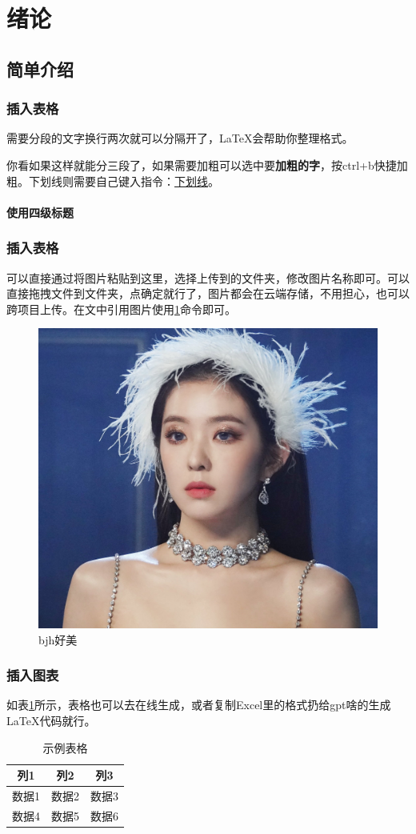 
\section{绪论}
\subsection{简单介绍}
\subsubsection{插入表格}
需要分段的文字换行两次就可以分隔开了，\LaTeX 会帮助你整理格式。

你看如果这样就能分三段了，如果需要加粗可以选中要\textbf{加粗的字}，按ctrl+b快捷加粗。下划线则需要自己键入指令：\underline{下划线}。
\paragraph{使用四级标题}

\subsubsection{插入表格}
可以直接通过将图片粘贴到这里，选择上传到的文件夹，修改图片名称即可。可以直接拖拽文件到文件夹，点确定就行了，图片都会在云端存储，不用担心，也可以跨项目上传。在文中引用图片使用\ref{fig:exm}命令即可。
\begin{figure}[h]
    \centering
    \includegraphics[width=0.3\linewidth]{figs/image.png}
    \caption{bjh好美}
    \label{fig:exm}
\end{figure}

\subsubsection{插入图表}如表\ref{tab:example}所示，表格也可以去在线生成，或者复制Excel里的格式扔给gpt啥的生成\LaTeX 代码就行。

\begin{table}[h]
\centering
\caption{示例表格}
\label{tab:example}
\renewcommand{\arraystretch}{1.3} %
\begin{tabular}{ccc}%
\toprule
列1 & 列2 & 列3 \\%
\midrule
数据1 & 数据2 & 数据3 \\
数据4 & 数据5 & 数据6 \\
\bottomrule
\end{tabular}
\end{table}

